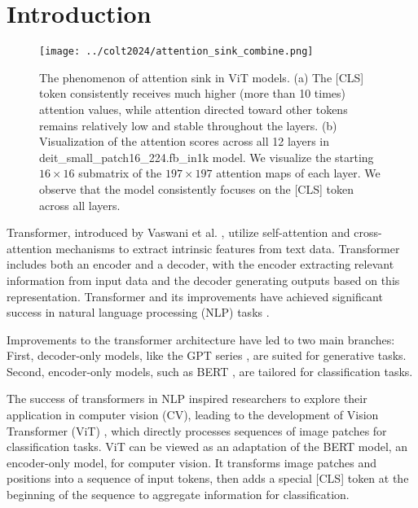 \section{Introduction}
\label{sec:intro}

\begin{figure*}
  \centering
  \texttt{[image: ../colt2024/attention\_sink\_combine.png]}
  \caption{The phenomenon of attention sink in ViT models. (a) The [CLS] token consistently receives much higher (more than 10 times) attention values, while attention directed toward other tokens remains relatively low and stable throughout the layers. (b) Visualization of the attention scores across all 12 layers in deit\_small\_patch16\_224.fb\_in1k model. We visualize the starting $16\times16$ submatrix of the $197\times197$ attention maps of each layer. We observe that the model consistently focuses on the [CLS] token across all layers.}
  \label{fig:attention-sink}
\end{figure*}


Transformer, introduced by Vaswani et al. \cite{vaswani2017attention}, utilize self-attention and cross-attention mechanisms to extract intrinsic features from text data. 
Transformer includes both an encoder and a decoder, with the encoder extracting relevant information from input data and the decoder generating outputs based on this representation.
Transformer and its improvements have achieved significant success in natural language processing (NLP) tasks \cite{vaswani2017attention, devlin2018bert,radford2018improving, brown2020language,ouyang2022training}.

Improvements to the transformer architecture have led to two main branches: First, decoder-only models, like the GPT series \cite{radford2018improving, brown2020language,ouyang2022training}, are suited for generative tasks. Second, encoder-only models, such as BERT  \cite{devlin2018bert}, are tailored for classification tasks.

The success of transformers in NLP inspired researchers to explore their application in computer vision (CV), leading to the development of Vision Transformer (ViT) \cite{dosovitskiy2021an}, which directly processes sequences of image patches for classification tasks.
ViT can be viewed as an adaptation of the BERT model, an encoder-only model, for computer vision.
It transforms image patches and positions into a sequence of input tokens, then adds a special [CLS] token at the beginning of the sequence to aggregate information for classification.

